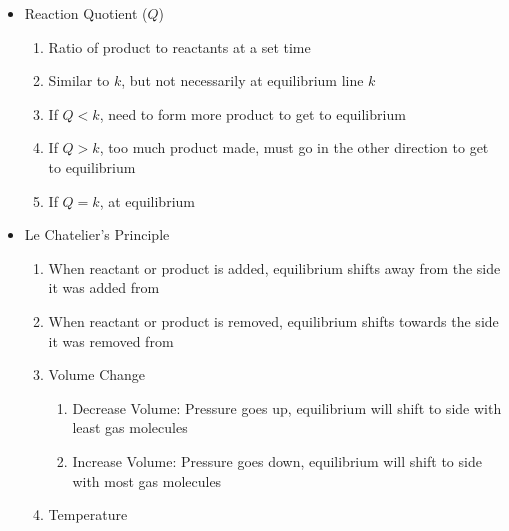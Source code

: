 \documentclass[12pt]{article}
\begin{document}
\begin{itemize}
\begin{enumerate}
    \end{enumerate}

  \item Reaction Quotient ($Q$)

    \begin{enumerate}

      \item Ratio of product to reactants at a set time

      \item Similar to $k$, but not necessarily at equilibrium line $k$

      \item If $Q<k$, need to form more product to get to equilibrium

      \item If $Q>k$, too much product made, must go in the other direction to get to equilibrium

      \item If $Q=k$, at equilibrium

    \end{enumerate}

  \item Le Chatelier's Principle

    \begin{enumerate}

      \item When reactant or product is added, equilibrium shifts away from the side it was added from

      \item When reactant or product is removed, equilibrium shifts towards the side it was removed from

      \item Volume Change

        \begin{enumerate}

          \item Decrease Volume: Pressure goes up, equilibrium will shift to side with least gas molecules

          \item Increase Volume: Pressure goes down, equilibrium will shift to side with most gas molecules

        \end{enumerate}

      \item Temperature

        \begin{enumerate}


\end{enumerate}
\end{enumerate}
\end{itemize}
\end{document}
